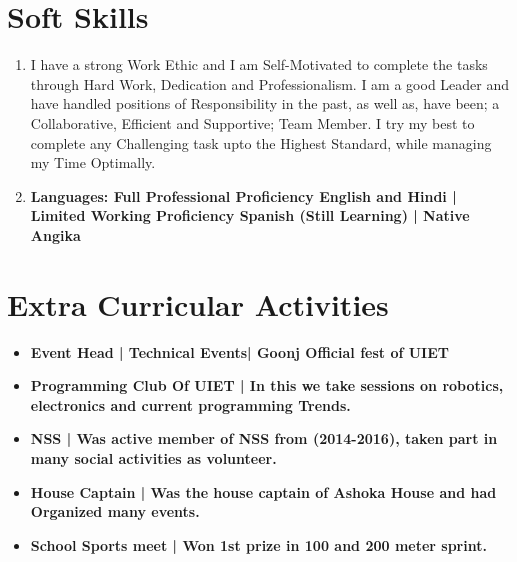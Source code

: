 \documentclass[11pt]{article}
\begin{document}
\begin{minipage}{18cm}

\fontsize{10pt}{13pt}\selectfont
\section{Soft Skills}
\begin{enumerate}[leftmargin=*]
\item  I have a strong Work Ethic and I am Self-Motivated to complete the tasks through Hard Work, Dedication and Professionalism. I am a good Leader and have handled positions of Responsibility in the past, as well as, have been; a Collaborative, Efficient and Supportive; Team Member. I try my best to complete any Challenging task upto the Highest Standard, while managing my Time Optimally.\\

\item \bfseries Languages: 
Full Professional Proficiency \mdseries English and Hindi | \bfseries Limited Working Proficiency \mdseries Spanish (Still Learning) | \bfseries Native \mdseries Angika
\end{enumerate}

\section{Extra Curricular Activities}
\begin{itemize}[leftmargin=*]
\item \bfseries Event Head \mdseries | Technical Events| Goonj Official fest of UIET
\item \bfseries Programming Club Of UIET  \mdseries | In this we take sessions on robotics, electronics and current programming Trends.
\item \bfseries NSS \mdseries | Was active member of NSS from (2014-2016), taken part in many social activities as volunteer.
  
\item \bfseries House Captain \mdseries | Was the house captain of Ashoka House and had Organized many events.
\item \bfseries School Sports meet \mdseries | Won 1st prize in 100 and 200 meter sprint.
\end{itemize}












\end{minipage}
\end{document}
